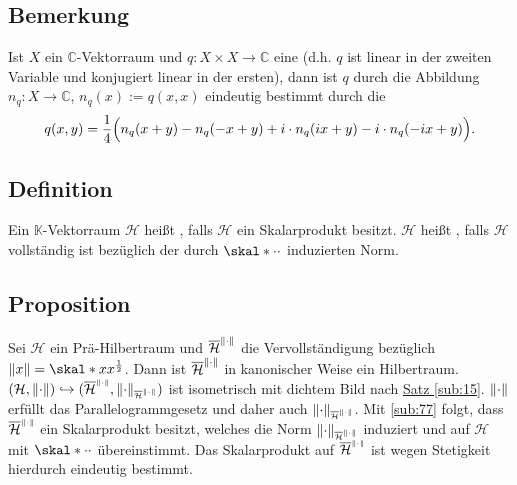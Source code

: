 \subsection[Bemerkung: Polarisierungsidentität]{Bemerkung} %
\label{sub:78}
Ist $X$ ein $\mathds{C}$-Vektorraum und $q \colon X \times X \to \mathds{C}$ eine  (d.h. $q$ ist linear in der zweiten Variable und konjugiert 
linear in der ersten), dann ist $q$ durch die Abbildung $n_q \colon X \to \mathds{C}$, $n_q(x) := q(x,x)$ eindeutig bestimmt durch die 
\[
	q(x,y) = \frac{1}{4} \enbrace[\Big]{n_q(x+y) - n_q(-x+y) + i \cdot n_q(i x +y) - i \cdot n_q(-ix +y)}.  
\]

\subsection[Definition: Prä-Hilbertraum und Hilbertraum]{Definition} %
\label{sub:79}
Ein $\mathds{K}$-Vektorraum $\mathcal{H}$ heißt , falls $\mathcal{H}$ ein Skalarprodukt besitzt. $\mathcal{H}$ heißt , falls
$\mathcal{H}$ vollständig ist bezüglich der durch $\skal*{\cdot}{\cdot}$ induzierten Norm.

\subsection[Proposition: Die Vervollständigung eines Prä-Hilbertraumes ist ein Hilbertraum]{Proposition} %
\label{sub:710}
Sei $\mathcal{H}$ ein Prä-Hilbertraum und $\overline{\mathcal{H}}^{\norm{\cdot}}$ die Vervollständigung bezüglich $\norm{x} = \skal*{x}{x}^{\frac{1}{2}}$. Dann ist
$\overline{\mathcal{H}}^{\norm{\cdot}}$ in kanonischer Weise ein Hilbertraum.
$\enbrace{\mathcal{H}, \norm{\cdot}}\hookrightarrow\enbrace{\overline{\mathcal{H}}^{\scriptscriptstyle\norm{\cdot}}, 
\norm[\scriptscriptstyle\overline{\mathcal{H}}^{\norm{\cdot}}]{\cdot}}$ ist isometrisch mit dichtem Bild nach \hyperref[sub:15]{Satz \ref*{sub:15}}. $\norm{\cdot}$ erfüllt 
das Parallelogrammgesetz und daher auch $\norm[\scriptscriptstyle\overline{\mathcal{H}}^{\norm{\cdot}}]{\cdot}$. Mit \ref{sub:77} folgt, dass 
$\overline{\mathcal{H}}^{\scriptscriptstyle\norm{\cdot}}$ ein Skalarprodukt besitzt, welches die Norm 
$\norm[\scriptscriptstyle\overline{\mathcal{H}}^{\norm{\cdot}}]{\cdot}$ induziert und auf $\mathcal{H}$ mit $\skal*{\cdot}{\cdot}$ übereinstimmt. Das Skalarprodukt auf 
$\overline{\mathcal{H}}^{\scriptscriptstyle\norm{\cdot}}$ ist wegen Stetigkeit hierdurch eindeutig bestimmt. \bewende

